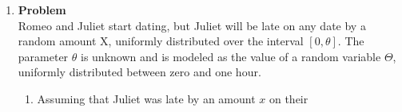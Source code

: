 \documentclass[12pt]{article}
\newenvironment{Ex}{\textbf{Problem}\vspace{.75em}\\}{}
\newcommand{\dd}[1]{\:\mathrm{d}{#1}}
\begin{document}
\begin{enumerate}
\begin{Ex}
\begin{solution}
\begin{enumerate}
\begin{equation}
\begin{aligned}
              & \frac{1}{y-2} &&\quad 2 \le x \le 3 \\
              & 1 &&\quad 3 < x < 11 \\
              & \frac{1}{13-y} &&\quad 11 < x < 12 \\
            \end{aligned} \right.
        \end{equation}
        So that now the expectation is easy to find
        \begin{equation}
          \label{eq:3a-expectation-piecewise}
          E[X|Y=y] = \left\{
            \begin{aligned}
              & \int_{2}^{y} \frac{1}{y-2}\dd{x} &&\quad 2 \le x \le 3 \\
              & \int_{y-1}^{y}\dd{x} &&\quad 3 < x < 11 \\
              & \int_{y-1}^{12}\frac{1}{13-y}\dd{x} &&\quad 11 < x < 12 \\
            \end{aligned} \right.
        \end{equation}
        Which turns out to be
        \begin{equation}
          \label{eq:3a-expectation-piecewise-sol}
          \implies E[X|Y=y] = \left\{
            \begin{aligned}
              & \frac{y+2}{2} &&\quad 2 \le x \le 3 \\
              & y-\frac{1}{2} &&\quad 3 < x < 11 \\
              & \frac{11+y}{2} &&\quad 11 < x < 12 \\
            \end{aligned} \right.
        \end{equation}
      \item {\huge \color{red} TODO}
      \end{enumerate}
    \end{solution}
  \end{Ex}
\item
  \begin{Ex}
    Romeo and Juliet start dating, but Juliet will be late on any date
    by a random amount X, uniformly distributed over the interval $[0,
    \theta]$. The parameter $\theta$ is unknown and is modeled as the
    value of a random variable $\Theta$, uniformly distributed between
    zero and one hour.
    \begin{enumerate}
    \item Assuming that Juliet was late by an amount $x$ on their

\end{enumerate}
\end{Ex}
\end{enumerate}
\end{document}
